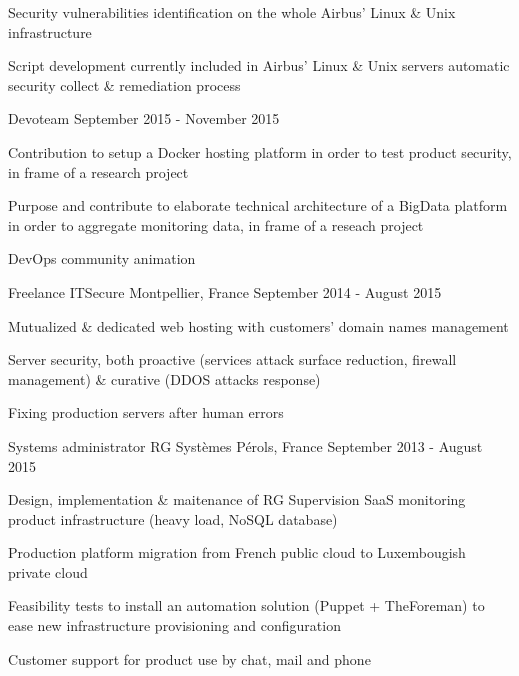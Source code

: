 \begin{cventries}
{\begin{cvsubentries}
{\begin{cvitems}
              \item {Security vulnerabilities identification on the whole Airbus' Linux \& Unix infrastructure}
              \item {Script development currently included in Airbus' Linux \& Unix servers automatic security collect \& remediation process}
            \end{cvitems}
          }
        \cvsubentry
          {}
          {Devoteam}
          {September 2015 - November 2015}
          {
            \begin{cvitems} %
              \item {Contribution to setup a Docker hosting platform in order to test product security, in frame of a research project}
              \item {Purpose and contribute to elaborate technical architecture of a BigData platform in order to aggregate monitoring data, in frame of a reseach project}
              \item {DevOps community animation}
            \end{cvitems}
          }
      \end{cvsubentries}
    }
  
  \cventry
    {Freelance} %
    {ITSecure} %
    {Montpellier, France} %
    {September 2014 - August 2015} %
    {
      \begin{cvitems} %
        \item {Mutualized \& dedicated web hosting with customers' domain names management}
        \item {Server security, both proactive (services attack surface reduction, firewall management) \& curative (DDOS attacks response)}
        \item {Fixing production servers after human errors}
      \end{cvitems}
    }
  
  \cventry
    {Systems administrator} %
    {RG Systèmes} %
    {Pérols, France} %
    {September 2013 - August 2015} %
    {
      \begin{cvitems} %
        \item {Design, implementation \& maitenance of RG Supervision SaaS monitoring product infrastructure (heavy load, NoSQL database)}
        \item {Production platform migration from French public cloud to Luxembougish private cloud}
        \item {Feasibility tests to install an automation solution (Puppet + TheForeman) to ease new infrastructure provisioning and configuration}
        \item {Customer support for product use by chat, mail and phone}
      \end{cvitems}
    }
  

\end{cventries}
